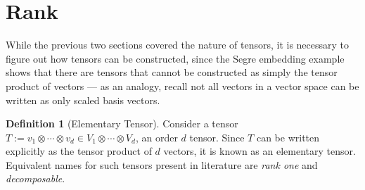 \documentclass[12pt,a4paper,oneside]{book}
\theoremstyle{definition}
\newtheorem{definition}{Definition}[section]
\begin{document}

\section{Rank}\label{section:tensorrank}
While the previous two sections covered the nature of tensors, it is necessary to figure out how tensors can be constructed, since the Segre embedding example shows that there are tensors that cannot be constructed as simply the tensor product of vectors --- as an analogy, recall not all vectors in a vector space can be written as only scaled basis vectors.
\begin{definition}[Elementary Tensor]\label{defn:elementarytensors}
    Consider a tensor $T := v_1 \otimes \cdots \otimes v_d \in V_1 \otimes \cdots \otimes V_d$, an order $d$ tensor. Since $T$ can be written explicitly as the tensor product of $d$ vectors, it is known as an elementary tensor. Equivalent names for such tensors present in literature are \textit{rank one} and \textit{decomposable}.
\end{definition}
\end{document}
